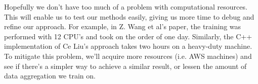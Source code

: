 \documentclass[10pt]{paper}
\numberwithin{equation}{section} %
\numberwithin{figure}{section} %
\numberwithin{table}{section} %
\begin{document}
Hopefully we don't have too much of a problem with computational resources. This will enable us to test our methods easily, giving us more time to debug and refine our approach. For example, in Z. Wang et al's paper, the training was performed with 12 CPU's and took on the order of one day. Similarly, the C++ implementation of Ce Liu's approach takes two hours on a heavy-duty machine. To mitigate this problem, we'll acquire more resources (i.e. AWS machines) and see if there's a simpler way to achieve a similar result, or lessen the amount of data aggregation we train on. 
\end{document}
